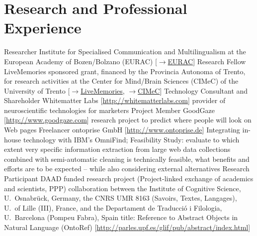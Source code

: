 \documentclass[11pt,a4paper]{moderncv}
\begin{document}
\section{Research and Professional Experience}
        {Researcher}
        {Institute for Specialised Communication and Multilingualism at the
        European Academy of Bozen/Bolzano (EURAC) [\href{http://www.eurac.edu}
        {$\rightarrow$EURAC}]}
        {}{}{}
        {Research Fellow}
        {LiveMemories sponsored grant, financed by the Provincia Autonoma of
        Trento, for research activities at the Center for Mind/Brain Sciences
        (CIMeC) of the University of Trento [\href{http://www.livememories.org}
        {$\rightarrow$LiveMemories},
        \href{http://www.cimec.unitn.it}{$\rightarrow$CIMeC}]}
        {}{}{}
        {Technology Consultant and Shareholder}
        {Whitematter Labs [\url{http://whitematterlabs.com}]}
        {\small provider of neuroscientific technologies for marketers}
        {}{}
        {Project Member}
        {GoodGaze [\url{http://www.goodgaze.com}]}
        {\small research project to predict where people will look on Web pages}
        {}{}
        {Freelancer}
        {ontoprise GmbH [\url{http://www.ontoprise.de}]}
        {\small Integrating in-house technology with IBM's OmniFind;
            Feasibility Study: evaluate to which extent very specific
            information extraction from large web data collections combined with
            semi-automatic cleaning is technically feasible, what benefits and
            efforts are to be expected -- while also considering external
        alternatives}
        {}{}
        {Research Participant}
        {DAAD funded research project (Project-linked exchange of academics and
        scientists, PPP)}
        {\small collaboration between the Institute of Cognitive Science,
        U.~Osnabr\"{u}ck, Germany, the CNRS UMR 8163 (Savoirs, Textes,
        Langages), U.~of Lille (III), France, and the Departament de
        Traducci\'{o} i Filologia, U.~Barcelona (Pompeu Fabra), Spain}
        {\small title: Reference to Abstract Objects in Natural Language
        (OntoRef) [\url{http://parles.upf.es/glif/pub/abstract/index.html}]}
        {}
\end{document}
